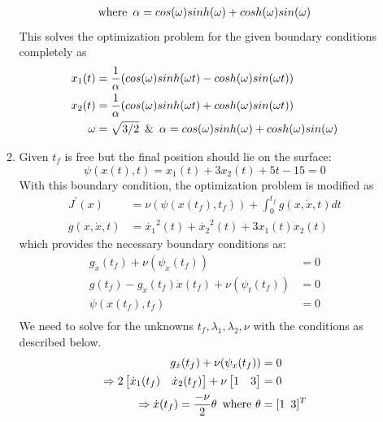 \begin{enumerate}
\begin{enumerate}
\begin{align*}
			 &\text{where} \enskip \alpha = cos(\omega) sinh(\omega) +cosh(\omega) sin(\omega) \\
   \end{align*}
   This solves the optimization problem for the given boundary conditions completely as 
   \begin{align*}
    x_1(t) &= \frac{1}{\alpha} (cos(\omega) sinh(\omega t) -cosh(\omega) sin(\omega t))\\
    x_2(t) &= \frac{1}{\alpha} (cos(\omega) sinh(\omega t) + cosh(\omega) sin(\omega t))\\
    \omega &= \sqrt{3/2} \enskip \& \enskip \alpha = cos(\omega) sinh(\omega) +cosh(\omega) sin(\omega) \\
   \end{align*}
   
   \item Given $t_f$ is free but the final position should lie on the surface:
   \begin{equation*}
   \psi(x(t),t) = x_1(t) + 3 x_2(t) + 5 t - 15 = 0
   \end{equation*}
   With this boundary condition, the optimization problem is modified as 
   \begin{align*}
    J^{\prime} (x) &= \nu (\psi(x(t_f), t_f)) + \int_0^{t_f} g(x,\dot x, t) dt\\
    g(x,\dot x, t) &= {\dot{x_1}}^2(t) + {\dot{x_2}}^2(t) + 3 x_1(t) x_2(t) 
   \end{align*}
   which provides the necessary boundary conditions as:
   \begin{align*}
   g_{\dot x} (t_f) + \nu (\psi_x(t_f)) &= 0 \\
   g(t_f) - g_{\dot x}(t_f) \dot x(t_f) + \nu (\psi_t(t_f)) &= 0 \\
   \psi(x(t_f),t_f) &= 0\\
   \end{align*}
   We need to solve for the unknowns $t_f, \lambda_1, \lambda_2, \nu$ with the conditions as described below.
   \begin{align*}
   g_{\dot x} (t_f) + \nu (\psi_x(t_f)) &= 0 \\
   \Rightarrow 2 \begin{bmatrix}
               \dot x_{1}(t_f) & \dot x_{2}(t_f)
               \end{bmatrix} + \nu 
	       \begin{bmatrix}
	        1 & 3 
	       \end{bmatrix} &= 0 \\
    \Rightarrow \dot{x}(t_f) = \frac{-\nu}{2} \theta \enskip \text{where } \theta &= [1 \enskip 3]^{T}\\

\end{align*}
\end{enumerate}
\end{enumerate}

